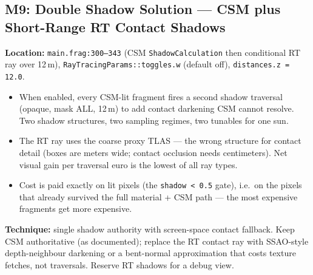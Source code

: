 \documentclass[11pt,a4paper]{article}
\begin{document}
\subsection{M9: Double Shadow Solution --- CSM plus Short-Range RT Contact Shadows}

\textbf{Location:} \texttt{main.frag:300--343} (CSM \texttt{ShadowCalculation} then conditional RT ray over 12\,m), \texttt{RayTracingParams::toggles.w} (default off), \texttt{distances.z = 12.0}.

\begin{itemize}
    \item When enabled, every CSM-lit fragment fires a second shadow traversal (opaque, mask ALL, 12\,m) to add contact darkening CSM cannot resolve. Two shadow structures, two sampling regimes, two tunables for one sun.
    \item The RT ray uses the coarse proxy TLAS --- the wrong structure for contact detail (boxes are meters wide; contact occlusion needs centimeters). Net visual gain per traversal euro is the lowest of all ray types.
    \item Cost is paid exactly on lit pixels (the \texttt{shadow \textless{} 0.5} gate), i.e.\ on the pixels that already survived the full material + CSM path --- the most expensive fragments get more expensive.
\end{itemize}

\textbf{Technique:} single shadow authority with screen-space contact fallback. Keep CSM authoritative (as documented); replace the RT contact ray with SSAO-style depth-neighbour darkening or a bent-normal approximation that costs texture fetches, not traversals. Reserve RT shadows for a debug view.
\end{document}
